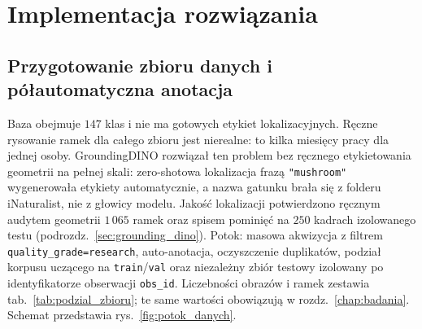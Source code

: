 \chapter{Implementacja rozwiązania}\label{chap:implementacja}
\section{Przygotowanie zbioru danych i półautomatyczna anotacja}
Baza obejmuje $147$ klas i nie ma gotowych etykiet lokalizacyjnych. Ręczne rysowanie ramek dla całego zbioru jest nierealne: to kilka miesięcy pracy dla jednej osoby. GroundingDINO rozwiązał ten problem bez ręcznego etykietowania geometrii na pełnej skali: zero-shotowa lokalizacja frazą \texttt{"mushroom"} wygenerowała etykiety automatycznie, a nazwa gatunku brała się z folderu iNaturalist, nie z głowicy modelu. Jakość lokalizacji potwierdzono ręcznym audytem geometrii $1\,065$ ramek oraz spisem pominięć na $250$ kadrach izolowanego testu (podrozdz.~\ref{sec:grounding_dino}). Potok: masowa akwizycja z filtrem \texttt{quality\_grade=research}, auto-anotacja, oczyszczenie duplikatów, podział korpusu uczącego na \texttt{train}/\texttt{val} oraz niezależny zbiór testowy izolowany po identyfikatorze obserwacji \texttt{obs\_id}. Liczebności obrazów i ramek zestawia tab.~\ref{tab:podzial_zbioru}; te same wartości obowiązują w rozdz.~\ref{chap:badania}. Schemat przedstawia rys.~\ref{fig:potok_danych}.


